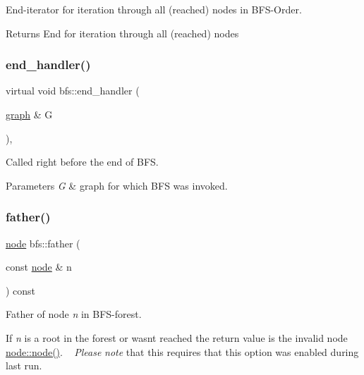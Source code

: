 End-\/iterator for iteration through all (reached) nodes in B\+F\+S-\/\+Order. 

\begin{DoxyReturn}{Returns}
End for iteration through all (reached) nodes 
\end{DoxyReturn}
\mbox{\label{classbfs_ad99b9aeb177a8a2e0ce1c3673082cddf}} 
\subsubsection{\texorpdfstring{end\+\_\+handler()}{end\_handler()}}
{\footnotesize\ttfamily virtual void bfs\+::end\+\_\+handler (\begin{DoxyParamCaption}\item[{\mbox{\hyperlink{classgraph}{graph}} \&}]{G }\end{DoxyParamCaption})\hspace{0.3cm}{\ttfamily [inline]}, {\ttfamily [virtual]}}



Called right before the end of B\+FS. 


\begin{DoxyParams}{Parameters}
{\em G} & graph for which B\+FS was invoked. \\
\hline
\end{DoxyParams}
\mbox{\label{classbfs_a3e1a7b0e4bde586d0be44616e533c59c}} 
\subsubsection{\texorpdfstring{father()}{father()}}
{\footnotesize\ttfamily \mbox{\hyperlink{classnode}{node}} bfs\+::father (\begin{DoxyParamCaption}\item[{const \mbox{\hyperlink{classnode}{node}} \&}]{n }\end{DoxyParamCaption}) const\hspace{0.3cm}{\ttfamily [inline]}}



Father of node {\itshape n} in B\+F\+S-\/forest. 

If {\itshape n} is a root in the forest or wasn\textquotesingle{}t reached the return value is the invalid node \mbox{\hyperlink{classnode_ad603259398d5667e3b97a6322a2bcc20}{node\+::node()}}. ~\newline
 {\itshape Please} {\itshape note} that this requires that this option was enabled during last run.


